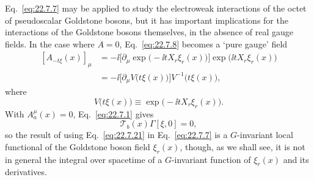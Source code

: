 Eq.~\eqref{eq:22.7.7} may be applied to study the electroweak interactions
of the octet of pseudoscalar Goldstone bosons, but it has important
implications for the interactions of the Goldstone bosons themselves, in
the absence of real gauge fields. In the case where $A=0$,
Eq.~\eqref{eq:22.7.8} becomes a `pure gauge' field
\begin{equation}
 \begin{aligned}
 [A_{-t\xi}(x)]_\mu
 &=-\ii\bigl[\partial_\mu\exp\bigl(-\ii tX_r\xi_r(x)\bigr)\bigr]
 \exp\bigl(\ii tX_r\xi_r(x)\bigr)
 \\
 &=-\ii\bigl[\partial_\mu V\bigl(t\xi(x)\bigr)\bigr]
 V^{-1}\bigl(t\xi(x)\bigr),
 \end{aligned}
 \tag{22.7.21}\label{eq:22.7.21}
\end{equation}
where
\begin{equation}
 V\bigl(t\xi(x)\bigr)
 \equiv\exp\bigl(-\ii tX_r\xi_r(x)\bigr).
 \tag{22.7.22}\label{eq:22.7.22}
\end{equation}
With $A_a^\mu(x)=0$, Eq.~\eqref{eq:22.7.1} gives
\begin{equation}
 \mathcal T_b(x)\Gamma[\xi,0]=0,
 \tag{22.7.23}\label{eq:22.7.23}
\end{equation}
so the result of using Eq.~\eqref{eq:22.7.21} in
Eq.~\eqref{eq:22.7.7} is a $G$-invariant local functional of the
Goldstone boson field $\xi_r(x)$, though, as we shall see, it is not in
general the integral over spacetime of a $G$-invariant function of
$\xi_r(x)$ and its derivatives.

